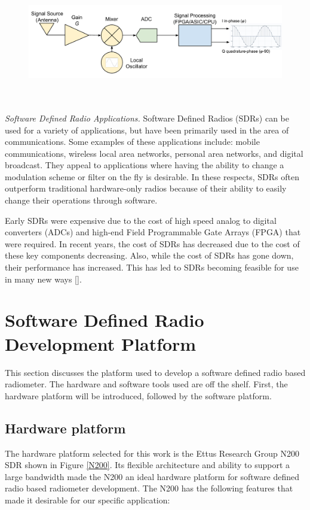 {\begin{figure}[h!tb] 
\centering
\includegraphics[width=\textwidth]{Images/SDR_Prac_block.pdf}
\label{prac_sdr}
\end{figure}
}
\ \\ \ \\

\emph{Software Defined Radio Applications.}  Software Defined Radios (SDRs) can be used for a variety of applications, but have been primarily used in the area of communications.  Some examples of these applications include:  mobile communications, wireless local area networks, personal area networks, and digital broadcast.  They appeal to applications where having the ability to change a modulation scheme or filter on the fly is desirable.  In these respects, SDRs often outperform traditional hardware-only radios because of their ability to easily change their operations through software.  

Early SDRs were expensive due to the cost of high speed analog to digital converters (ADCs) and high-end Field Programmable Gate Arrays (FPGA) that were required.  In recent years, the cost of SDRs has decreased due to the cost of these key components decreasing.  Also, while the cost of SDRs has gone down, their performance has increased.  This has led to SDRs becoming feasible for use in many new ways [\cite{jondral2005software}].

\section{Software Defined Radio Development Platform} \label{SDR_platform}
This section discusses the platform used to develop a software defined radio based radiometer.  The hardware and software tools used are off the shelf.  First, the hardware platform will be introduced, followed by the software platform.  

\subsection{Hardware platform}\label{N200_HW}
The hardware platform selected for this work is the Ettus Research Group N200 SDR shown in Figure \ref{N200}.  Its flexible architecture and ability to support a large bandwidth made the N200 an ideal hardware platform for software defined radio based radiometer development.  The N200 has the following features that made it desirable for our specific application:


